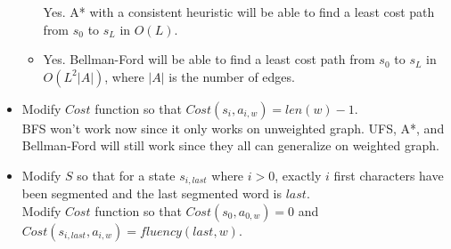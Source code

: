 \documentclass[11pt]{article}
\begin{document}
\begin{onehalfspace}
\begin{itemize}
\begin{itemize}
            Yes. A* with a consistent heuristic will be able to find a least cost path from $s_0$ to $s_L$ in $O(L)$.
            \item
            Yes. Bellman-Ford will be able to find a least cost path from $s_0$ to $s_L$ in $O(L^2|A|)$, where $|A|$ is the number of edges.
        \end{itemize}
        \item
            Modify $Cost$ function so that $Cost(s_i, a_{i,w}) = len(w) - 1$. \\
            BFS won't work now since it only works on unweighted graph. UFS, A*, and Bellman-Ford will still work since they all can generalize on weighted graph.
        \item
            Modify $S$ so that for a state $s_{i,last}$ where $i > 0$, exactly $i$ first characters have been segmented and the last segmented word is $last$. \\
            Modify $Cost$ function so that $Cost(s_0, a_{0,w}) = 0$ and $Cost(s_{i,last}, a_{i,w}) = fluency(last, w)$.
    \end{itemize}
    \newpage{}

\end{onehalfspace}
\end{document}
